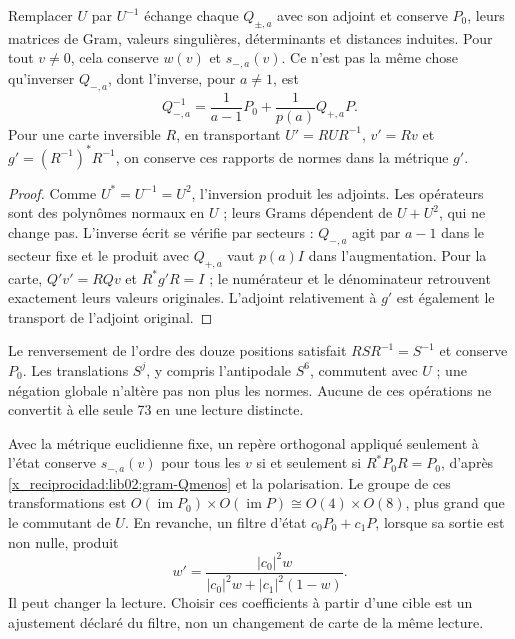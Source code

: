 \begin{proposition}
\label{x_reciprocidad:lib02:inversion-carta}
Remplacer \(U\) par \(U^{-1}\) échange chaque \(Q_{\pm,a}\) avec son adjoint et conserve \(P_0\), leurs matrices de Gram, valeurs singulières, déterminants et distances induites. Pour tout \(v\ne0\), cela conserve \(w(v)\) et \(s_{-,a}(v)\). Ce n'est pas la même chose qu'inverser \(Q_{-,a}\), dont l'inverse, pour \(a\ne1\), est
\begin{equation}
 Q_{-,a}^{-1}
 =\frac1{a-1}P_0+\frac1{p(a)}Q_{+,a}P.
 \label{x_reciprocidad:lib02:inversa-Q}
\end{equation}
Pour une carte inversible \(R\), en transportant
\(U'=RUR^{-1}\), \(v'=Rv\) et
\(g'=(R^{-1})^*R^{-1}\), on conserve ces rapports de normes dans
la métrique \(g'\).
\end{proposition}
\begin{proof}
Comme \(U^*=U^{-1}=U^2\), l’inversion produit les adjoints.
Les opérateurs sont des polynômes normaux en \(U\) ; leurs Grams dépendent
de \(U+U^2\), qui ne change pas. L’inverse écrit se vérifie par
secteurs : \(Q_{-,a}\) agit par \(a-1\) dans le secteur fixe et le produit
avec \(Q_{+,a}\) vaut \(p(a)I\) dans l’augmentation. Pour la carte,
\(Q'v'=RQv\) et \(R^*g'R=I\) ; le numérateur et le dénominateur retrouvent
exactement leurs valeurs originales. L’adjoint relativement à \(g'\)
est également le transport de l’adjoint original.
\end{proof}

Le renversement de l’ordre des douze positions satisfait
\(RSR^{-1}=S^{-1}\) et conserve \(P_0\). Les translations \(S^j\),
y compris l’antipodale \(S^6\), commutent avec \(U\) ; une négation
globale n’altère pas non plus les normes. Aucune de ces opérations ne convertit
à elle seule 73 en une lecture distincte.

Avec la métrique euclidienne fixe, un repère orthogonal appliqué seulement à l'état conserve \(s_{-,a}(v)\) pour tous les \(v\) si et seulement si \(R^*P_0R=P_0\), d'après \eqref{x_reciprocidad:lib02:gram-Qmenos} et la polarisation. Le groupe de ces transformations est \(O(\operatorname{im}P_0)\times O(\operatorname{im}P)
\cong O(4)\times O(8)\), plus grand que le commutant de \(U\). En revanche, un filtre d'état \(c_0P_0+c_1P\), lorsque sa sortie est non nulle, produit
\begin{equation}
 w'=
 \frac{|c_0|^2w}{|c_0|^2w+|c_1|^2(1-w)}.
 \label{x_reciprocidad:lib02:filtro-pesos}
\end{equation}
Il peut changer la lecture. Choisir ces coefficients à partir d’une cible est
un ajustement déclaré du filtre, non un changement de carte de la même
lecture.

